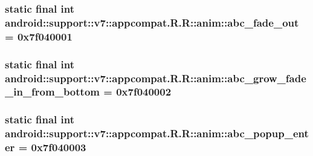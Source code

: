 \hypertarget{classandroid_1_1support_1_1v7_1_1appcompat_1_1_r_1_1anim_d2b65c521e9d62f11422cedae1a2ae37}{
\subsubsection[{abc\_\-fade\_\-out}]{\setlength{\rightskip}{0pt plus 5cm}static final int android::support::v7::appcompat.R.R::anim::abc\_\-fade\_\-out = 0x7f040001}}
\label{classandroid_1_1support_1_1v7_1_1appcompat_1_1_r_1_1anim_d2b65c521e9d62f11422cedae1a2ae37}


\hypertarget{classandroid_1_1support_1_1v7_1_1appcompat_1_1_r_1_1anim_3bfe4d4f22ffbca481e96c8334c5d958}{
\subsubsection[{abc\_\-grow\_\-fade\_\-in\_\-from\_\-bottom}]{\setlength{\rightskip}{0pt plus 5cm}static final int android::support::v7::appcompat.R.R::anim::abc\_\-grow\_\-fade\_\-in\_\-from\_\-bottom = 0x7f040002}}
\label{classandroid_1_1support_1_1v7_1_1appcompat_1_1_r_1_1anim_3bfe4d4f22ffbca481e96c8334c5d958}


\hypertarget{classandroid_1_1support_1_1v7_1_1appcompat_1_1_r_1_1anim_6640c6d23fe839845c83126f269615db}{
\subsubsection[{abc\_\-popup\_\-enter}]{\setlength{\rightskip}{0pt plus 5cm}static final int android::support::v7::appcompat.R.R::anim::abc\_\-popup\_\-enter = 0x7f040003}}
\label{classandroid_1_1support_1_1v7_1_1appcompat_1_1_r_1_1anim_6640c6d23fe839845c83126f269615db}


